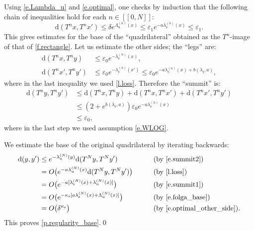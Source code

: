 \documentclass[JEP,XML,SOM,Unicode]{cedram}
\newcommand{\ldbrack}{[\![}
\newcommand{\rdbrack}{]\!]}
\theoremstyle{plain}
\theoremstyle{definition}
\newcommand{\dd}{\mathrm{d}}
\newcommand{\uu}{\mathrm{u}}
\renewcommand{\ss}{\mathrm{s}}
\let\epsilon\varepsilon
\begin{document}
Using \eqref{e.Lambda_u} and \eqref{e.optimal}, one checks by induction that
the following chain of inequa\-lities hold for each $n \in \ldbrack 0, N \rdbrack$:
\begin{equation}\label{e.base}
\dd(T^n x, T^n x')
\le \delta e^{\Lambda_\uu^{(n)}(x)}
\le \epsilon_1 e^{- a \lambda_\ss^{(n)}(x)}
\le \epsilon_1.
\end{equation}
This gives estimates for the base of the ``quadrilateral'' obtained as the $T^n$-image of that of \cref{f.rectangle}.
Let us estimate the other sides; the ``legs'' are:
\begin{align}
\dd(T^n x, T^n y) &\le \epsilon_0 e^{- \lambda_\ss^{(n)}(x)}, \label{e.leg1} \\
\dd(T^n x', T^n y') &\le \epsilon_0 e^{- \lambda_\ss^{(n)}(x')}
\le \epsilon_0 e^{- a\lambda_\ss^{(n)}(x) + b(\lambda_\ss,a)}, \label{e.leg2}
\end{align}
where in the last inequality we used \cref{l.loss}.
Therefore the ``summit'' is:
\begin{align}
\dd(T^n y, T^n y')
&\le \dd(T^n x, T^n y) + \dd(T^n x, T^n x') + \dd(T^n x', T^n y') \\
&\le (2 + e^{b(\lambda_\ss,a)}) \epsilon_0 e^{-a\lambda_\ss^{(n)}(x)} \label{e.summit1} \\
&\le \epsilon_0, \label{e.summit2}
\end{align}
where in the last step we used assumption \eqref{e.WLOG}.

We estimate the base of the original quadrilateral by iterating backwards:
\begin{alignat*}{2}
\dd(y,y')
&\le e^{-\lambda_\uu^{(N)}(y)} \dd(T^N y, T^N y')
&\qquad&\text{(by \eqref{e.summit2})} \\
&= O \big( e^{-a \lambda_\uu^{(N)}(x)} \dd(T^N y, T^N y') \big)
&\qquad&\text{(by \cref{l.loss})} \\
&= O \big( e^{-a [\lambda_\ss^{(N)}(x) + \lambda_\uu^{(N)}(x)]} \big)
&\qquad&\text{(by \eqref{e.summit1})} \\
&= O \big( e^{- \kappa_\ss [a \lambda_\ss^{(N)}(x) + \Lambda_\uu^{(N)}(x)]} \big)
&\qquad&\text{(by \eqref{e.folga_base})} \\
&= O \big( \delta^{\kappa_\ss} \big)
&\quad&\text{(by \eqref{e.optimal_other_side})}.
\end{alignat*}
This proves \cref{p.regularity_base}.\qed
\end{document}
